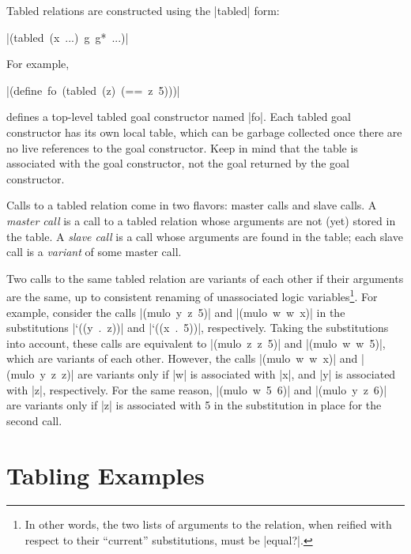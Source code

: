Tabled relations are constructed using the \scheme|tabled| form:

\wspace

\mbox{\scheme|(tabled (x ...) g g* ...)|}

\wspace

\noindent For example, 

\wspace

\mbox{\scheme|(define fo (tabled (z) (== z 5)))|}

\wspace

\noindent defines a top-level tabled goal constructor named
\scheme|fo|.  Each tabled goal constructor has its own local table,
which can be garbage collected once there are no live references to
the goal constructor.  Keep in mind that the table is associated with
the goal constructor, not the goal returned by the goal constructor.

Calls to a tabled relation come in two flavors: master calls and slave
calls.  A \emph{master call} is a call to a tabled relation whose
arguments are not (yet) stored in the table.  A \emph{slave call} is a
call whose arguments are found in the table; each slave call is a
\emph{variant} of some master call.

Two calls to the same tabled relation are variants of each other if
their arguments are the same, up to consistent renaming of
unassociated logic variables\footnote{In other words, the two lists of arguments
  to the relation, when reified with respect to their ``current'' substitutions, 
  must be \scheme|equal?|.}. For example, consider the calls
\mbox{\scheme|(mulo y z 5)|} and \mbox{\scheme|(mulo w w x)|} in the
substitutions \mbox{\scheme|`((y . z))|} and \mbox{\scheme|`((x . 5))|},
respectively.  Taking the substitutions into account, these calls are equivalent to
\mbox{\scheme|(mulo z z 5)|} and \mbox{\scheme|(mulo w w 5)|}, which are variants of 
each other.  However, the calls \mbox{\scheme|(mulo w w x)|} and \mbox{\scheme|(mulo y z z)|}
are variants only if \scheme|w| is associated with \scheme|x|, and \scheme|y| is associated with \scheme|z|,
respectively.  For the same reason, 
\mbox{\scheme|(mulo w 5 6)|} and \mbox{\scheme|(mulo y z 6)|} are variants only if 
\scheme|z| is associated with 5 in the substitution in place for the second call.

\section{Tabling Examples}\label{tablingexamples}

